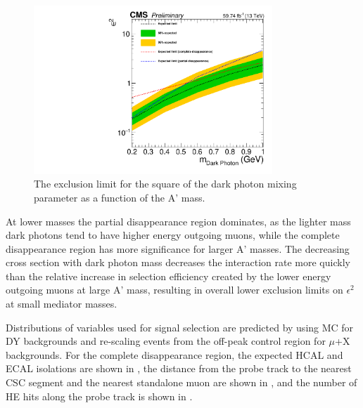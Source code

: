 \begin{figure}[htbp]
	\centering
	\includegraphics[width=0.8\textwidth]{figures/Limit_AllRegions.pdf}
	\caption[Exclusion Limits on the Dark Photon Mixing Parameter]{The exclusion limit for the square of the dark photon mixing parameter as a function of the A' mass.}
	\label{fig:limits}
\end{figure}

At lower masses the partial disappearance region dominates, as the lighter mass dark photons tend to have higher energy outgoing muons, while the complete disappearance region has more significance for larger A' masses. 
The decreasing cross section with dark photon mass decreases the interaction rate more quickly than the relative increase in selection efficiency created by the lower energy outgoing muons at large A' mass, resulting in overall lower exclusion limits on $\epsilon^{2}$ at small mediator masses. 

Distributions of variables used for signal selection are predicted by using MC for DY backgrounds and re-scaling events from the off-peak control region for $\mu$+X backgrounds.
For the complete disappearance region, the expected HCAL and ECAL isolations are shown in , the distance from the probe track to the nearest CSC segment and the nearest standalone muon are shown in , and the number of HE hits along the probe track is shown in .

